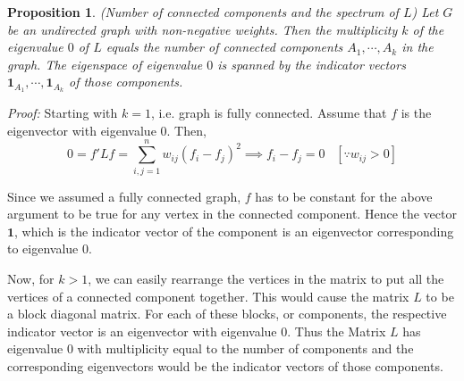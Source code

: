 \documentclass[10pt,a4paper, nocenter]{report}
\newtheorem{prop}{Proposition}
\begin{document}
    \begin{prop}
        (Number of connected components and the spectrum of $L$) Let $G$ be an undirected graph with non-negative weights. Then the multiplicity $k$ of the eigenvalue $0$ of $L$ equals the number of connected components $A_{1},\cdots,A_{k}$ in the graph. The eigenspace of eigenvalue $0$ is spanned by the indicator vectors $\mathbf{1}_{A_{1}},\cdots,\mathbf{1}_{A_{k}}$ of those components.				
    \end{prop}
    \textit{Proof:}
    Starting with $k=1$, i.e. graph is fully connected. Assume that $f$ is the eigenvector with eigenvalue $0$. Then,
    $$ 0 = f'Lf = \sum_{i,j=1}^{n}w_{ij}(f_{i}-f_{j})^{2} \implies f_{i} - f_{j}=0 \hspace{10pt}[\because w_{ij} > 0]$$
    
    Since we assumed a fully connected graph, $f$ has to be constant for the above argument to be true for any vertex in the connected component. Hence the vector $\textbf{1}$, which is the indicator vector of the component is an eigenvector corresponding to eigenvalue $0$. 
    
    Now, for $k>1$, we can easily rearrange the vertices in the matrix to put all the vertices of a connected component together. This would cause the matrix $L$ to be a block diagonal matrix. For each of these blocks, or components, the respective indicator vector is an eigenvector with eigenvalue 0. Thus the Matrix $L$ has eigenvalue $0$ with multiplicity equal to the number of components and the corresponding eigenvectors would be the indicator vectors of those components. 
    $ $\\
\end{document}
